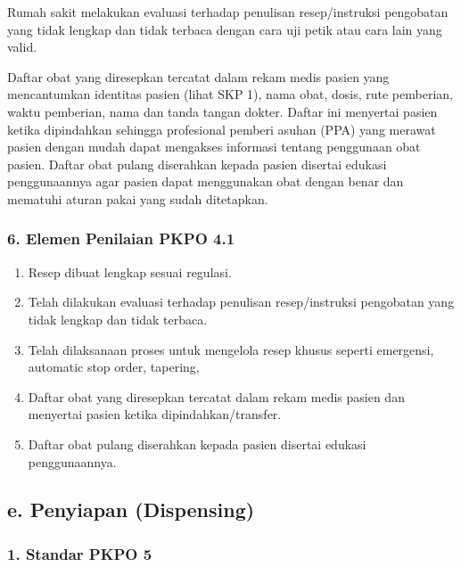 \documentclass[
]{book}
\providecommand{\tightlist}{%
  \setlength{\itemsep}{0pt}\setlength{\parskip}{0pt}}
\begin{document}
Rumah sakit melakukan evaluasi terhadap penulisan resep/instruksi pengobatan yang tidak lengkap dan tidak terbaca dengan cara uji petik atau cara lain yang valid.

Daftar obat yang diresepkan tercatat dalam rekam medis pasien yang mencantumkan identitas pasien (lihat SKP 1), nama obat, dosis, rute pemberian, waktu pemberian, nama dan tanda tangan dokter. Daftar ini menyertai pasien ketika dipindahkan sehingga profesional pemberi asuhan (PPA) yang merawat pasien dengan mudah dapat mengakses informasi tentang penggunaan obat pasien. Daftar obat pulang diserahkan kepada pasien disertai edukasi penggunaannya agar pasien dapat menggunakan obat dengan benar dan mematuhi aturan pakai yang sudah ditetapkan.

\hypertarget{elemen-penilaian-pkpo-4.1}{%
\subsubsection*{6. Elemen Penilaian PKPO 4.1}\label{elemen-penilaian-pkpo-4.1}}

\begin{enumerate}
\def\labelenumi{\alph{enumi}.}
\tightlist
\item
  Resep dibuat lengkap sesuai regulasi.
\item
  Telah dilakukan evaluasi terhadap penulisan resep/instruksi pengobatan yang tidak lengkap dan tidak terbaca.
\item
  Telah dilaksanaan proses untuk mengelola resep khusus seperti emergensi, automatic stop order, tapering,
\item
  Daftar obat yang diresepkan tercatat dalam rekam medis pasien dan menyertai pasien ketika dipindahkan/transfer.
\item
  Daftar obat pulang diserahkan kepada pasien disertai edukasi penggunaannya.
\end{enumerate}

\hypertarget{e.-penyiapan-dispensing}{%
\subsection*{e. Penyiapan (Dispensing)}\label{e.-penyiapan-dispensing}}

\hypertarget{standar-pkpo-5}{%
\subsubsection*{1. Standar PKPO 5}\label{standar-pkpo-5}}
\end{document}

